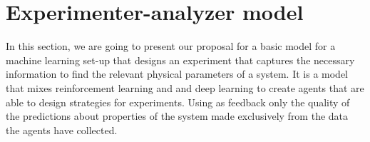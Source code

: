 \documentclass[11pt,a4paper,twoside]{report}
\newcommand{\+}{\textnormal{+} }
\theoremstyle{definition}
\newtheorem{mydef}[mythm]{Definition}
\newtheorem{myex}[mythm]{Example}
\numberwithin{equation}{chapter}
\begin{document}






\chapter{Experimenter-analyzer model} \label{EAmodel}

In this section, we are going to present our proposal for a basic model for a
machine learning set-up that designs an experiment that captures the necessary
information to find the relevant physical parameters of a system. It is a model
that mixes reinforcement learning and and deep learning to create agents that
are able to design strategies for experiments. Using as feedback only
the quality of the predictions about properties of the system made
exclusively from the data the agents have collected. 
\end{document}

